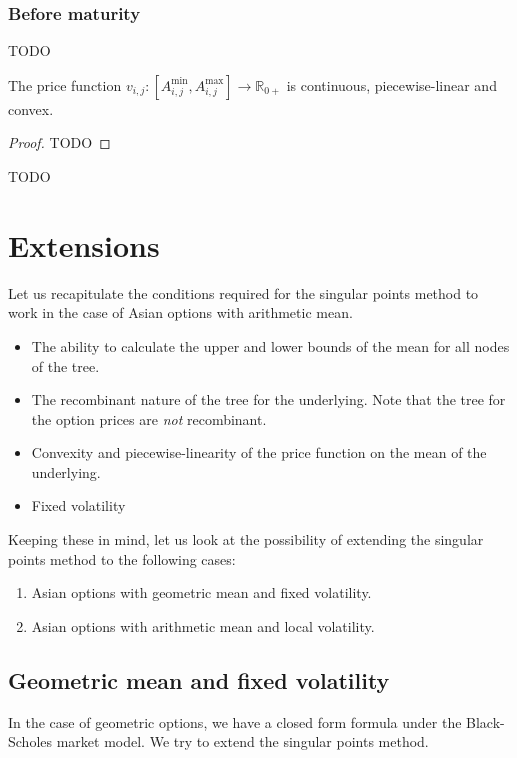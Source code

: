 \subsubsection{Before maturity}
TODO
\begin{lmm}
	The price function ${ v_{i,j}: \left[ A_{i,j}^{\min}, A_{i,j}^{\max} \right] \to \mathbb{R}_{0+} }$ is continuous, piecewise-linear and convex.
\end{lmm}
\begin{proof}
	TODO
\end{proof}
TODO
\clearpage


\section{Extensions}
\label{sec:sp-extensions}

Let us recapitulate the conditions required for the singular points method to work in the case of Asian options with arithmetic mean.
\begin{itemize}
\item The ability to calculate the upper and lower bounds of the mean for all nodes of the tree.
\item The recombinant nature of the tree for the underlying. Note that the tree for the option prices are \emph{not} recombinant.
\item Convexity and piecewise-linearity of the price function on the mean of the underlying.
\item Fixed volatility
\end{itemize}

Keeping these in mind, let us look at the possibility of extending the singular points method to the following cases:
\begin{enumerate}
\item Asian options with geometric mean and fixed volatility.
\item Asian options with arithmetic mean and local volatility.
\end{enumerate}



\subsection{Geometric mean and fixed volatility}
\label{sec:gm-fixed-vol}

In the case of geometric options, we have a closed form formula under the Black-Scholes market model. We try to extend the singular points method.

